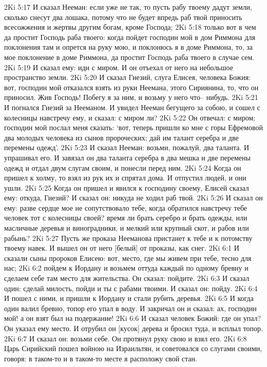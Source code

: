 2Ki 5:17  И сказал Нееман: если уже не так, то пусть рабу твоему дадут земли, сколько снесут два лошака, потому что не будет впредь раб твой приносить всесожжения и жертвы другим богам, кроме Господа;
2Ki 5:18  только вот в чем да простит Господь раба твоего: когда пойдет господин мой в дом Риммона для поклонения там и опрется на руку мою, и поклонюсь я в доме Риммона, то, за мое поклонение в доме Риммона, да простит Господь раба твоего в случае сем.
2Ki 5:19  И сказал ему: иди с миром. И он отъехал от него на небольшое пространство земли.
2Ki 5:20  И сказал Гиезий, слуга Елисея, человека Божия: вот, господин мой отказался взять из руки Неемана, этого Сириянина, то, что он приносил. Жив Господь! Побегу я за ним, и возьму у него что-- нибудь.
2Ki 5:21  И погнался Гиезий за Нееманом. И увидел Нееман бегущего за собою, и сошел с колесницы навстречу ему, и сказал: с миром ли?
2Ki 5:22  Он отвечал: с миром; господин мой послал меня сказать: `вот, теперь пришли ко мне с горы Ефремовой два молодых человека из сынов пророческих; дай им талант серебра и две перемены одежд'.
2Ki 5:23  И сказал Нееман: возьми, пожалуй, два таланта. И упрашивал его. И завязал он два таланта серебра в два мешка и две перемены одежд и отдал двум слугам своим, и понесли перед ним.
2Ki 5:24  Когда он пришел к холму, то взял из рук их и спрятал дома. И отпустил людей, и они ушли.
2Ki 5:25  Когда он пришел и явился к господину своему, Елисей сказал ему: откуда, Гиезий? И сказал он: никуда не ходил раб твой.
2Ki 5:26  И сказал он ему: разве сердце мое не сопутствовало тебе, когда обратился навстречу тебе человек тот с колесницы своей? время ли брать серебро и брать одежды, или масличные деревья и виноградники, и мелкий или крупный скот, и рабов или рабынь?
2Ki 5:27  Пусть же проказа Нееманова пристанет к тебе и к потомству твоему навек. И вышел он от него [белый] от проказы, как снег.
2Ki 6:1  И сказали сыны пророков Елисею: вот, место, где мы живем при тебе, тесно для нас;
2Ki 6:2  пойдем к Иордану и возьмем оттуда каждый по одному бревну и сделаем себе там место для жительства. Он сказал: пойдите.
2Ki 6:3  И сказал один: сделай милость, пойди и ты с рабами твоими. И сказал он: пойду.
2Ki 6:4  И пошел с ними, и пришли к Иордану и стали рубить деревья.
2Ki 6:5  И когда один валил бревно, топор его упал в воду. И закричал он и сказал: ах, господин мой! а он взят был на подержание!
2Ki 6:6  И сказал человек Божий: где он упал? Он указал ему место. И отрубил он [кусок] дерева и бросил туда, и всплыл топор.
2Ki 6:7  И сказал он: возьми себе. Он протянул руку свою и взял его.
2Ki 6:8  Царь Сирийский пошел войною на Израильтян, и советовался со слугами своими, говоря: в таком-то и в таком-то месте я расположу свой стан.
